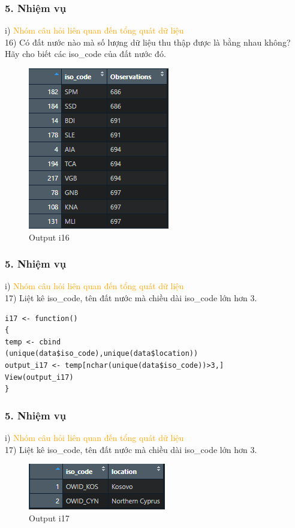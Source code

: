 \documentclass[english,10pt,table]{beamer}
\begin{document}
\begin{frame}[fragile]
\frametitle{5.  Nhiệm vụ}
	i) \textcolor{orange}{Nhóm câu hỏi liên quan đến tổng quát dữ liệu}\\
	16) Có đất nước nào mà số lượng dữ liệu thu thập được là bằng nhau không? Hãy cho biết các iso\_code của đất nước đó.
	\begin{figure}[h!]
	\begin{center}
		    \includegraphics[scale = 1]{Images/I/I16.png}
		            \caption{Output i16}
		\end{center}
		\end{figure}
\end{frame}

\begin{frame}[fragile]
\frametitle{5.  Nhiệm vụ}
	i) \textcolor{orange}{Nhóm câu hỏi liên quan đến tổng quát dữ liệu}\\
	17) Liệt kê iso\_code, tên đất nước mà chiều dài iso\_code lớn hơn 3.
	\begin{lstlisting}[frame=single]  
i17 <- function()
{
temp <- cbind
(unique(data$iso_code),unique(data$location))
output_i17 <- temp[nchar(unique(data$iso_code))>3,]
View(output_i17)
}
	\end{lstlisting}
\end{frame}

\begin{frame}[fragile]
\frametitle{5.  Nhiệm vụ}
	i) \textcolor{orange}{Nhóm câu hỏi liên quan đến tổng quát dữ liệu}\\
	17) Liệt kê iso\_code, tên đất nước mà chiều dài iso\_code lớn hơn 3.
	\begin{figure}[h!]
	\begin{center}
		    \includegraphics[scale = 1]{Images/I/I17.png}
		            \caption{Output i17}
		\end{center}
		\end{figure}
\end{frame}
\end{document}
